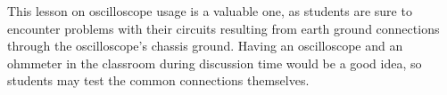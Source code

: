 





This lesson on oscilloscope usage is a valuable one, as students are sure to encounter problems with their circuits resulting from earth ground connections through the oscilloscope's chassis ground.  Having an oscilloscope and an ohmmeter in the classroom during discussion time would be a good idea, so students may test the common connections themselves.




